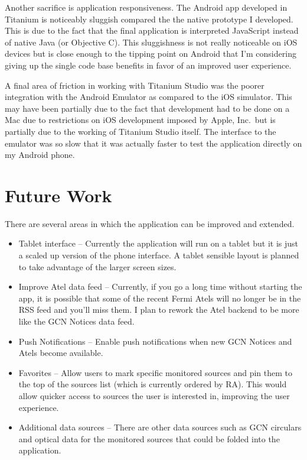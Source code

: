 Another sacrifice is application responsiveness.  The Android app developed in Titanium is noticeably sluggish compared the the native prototype I developed.  This is due to the fact that the final application is interpreted JavaScript instead of native Java (or Objective C).  This sluggishness is not really noticeable on iOS devices but is close enough to the tipping point on Android that I'm considering giving up the single code base benefits in favor of an improved user experience.

A final area of friction in working with Titanium Studio was the poorer integration with the Android Emulator as compared to the iOS simulator.  This may have been partially due to the fact that development had to be done on a Mac due to restrictions on iOS development imposed by Apple, Inc.\ but is partially due to the working of Titanium Studio itself.  The interface to the emulator was so slow that it was actually faster to test the application directly on my Android phone.

\section{Future Work}
There are several areas in which the application can be improved and extended. 
\begin{itemize}
\item{Tablet interface -- Currently the application will run on a tablet but it is just a scaled up version of the phone interface.  A tablet sensible layout is planned to take advantage of the larger screen sizes.}
\item{Improve Atel data feed -- Currently, if you go a long time without starting the app, it is possible that some of the recent Fermi Atels will no longer be in the RSS feed and you'll miss them.  I plan to rework the Atel backend to be more like the GCN Notices data feed.}
\item{Push Notifications -- Enable push notifications when new GCN Notices and Atels become available.}
\item{Favorites -- Allow users to mark specific monitored sources and pin them to the top of the sources list (which is currently ordered by RA). This would allow quicker access to sources the user is interested in, improving the user experience.}
\item{Additional data sources -- There are other data sources such as GCN circulars and optical data for the monitored sources that could be folded into the application.}
\end{itemize}

